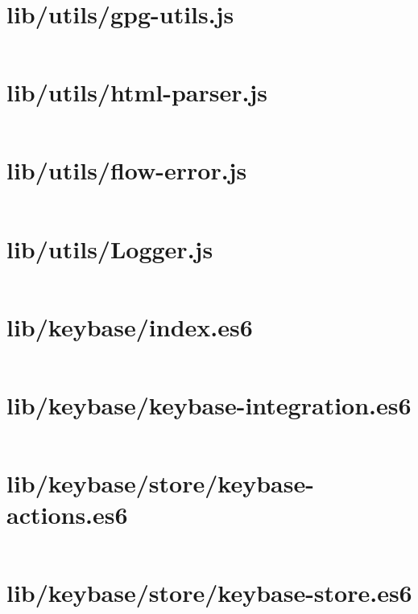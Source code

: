 \documentclass[10pt, letterpaper]{article}
\begin{document}
\section{lib/utils/gpg-utils.js}
\inputminted{javascript}{/home/mbilker/.nylas/dev/packages/cypher/lib/utils/gpg-utils.js}

\section{lib/utils/html-parser.js}
\inputminted{javascript}{/home/mbilker/.nylas/dev/packages/cypher/lib/utils/html-parser.js}

\section{lib/utils/flow-error.js}
\inputminted{javascript}{/home/mbilker/.nylas/dev/packages/cypher/lib/utils/flow-error.js}

\section{lib/utils/Logger.js}
\inputminted{javascript}{/home/mbilker/.nylas/dev/packages/cypher/lib/utils/Logger.js}

\section{lib/keybase/index.es6}
\inputminted{javascript}{/home/mbilker/.nylas/dev/packages/cypher/lib/keybase/index.es6}

\section{lib/keybase/keybase-integration.es6}
\inputminted{javascript}{/home/mbilker/.nylas/dev/packages/cypher/lib/keybase/keybase-integration.es6}

\section{lib/keybase/store/keybase-actions.es6}
\inputminted{javascript}{/home/mbilker/.nylas/dev/packages/cypher/lib/keybase/store/keybase-actions.es6}

\section{lib/keybase/store/keybase-store.es6}
\inputminted{javascript}{/home/mbilker/.nylas/dev/packages/cypher/lib/keybase/store/keybase-store.es6}
\end{document}
